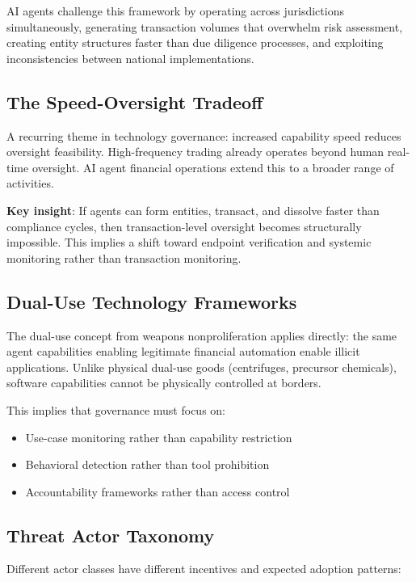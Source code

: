 \documentclass[11pt,letterpaper]{article}
\begin{document}
AI agents challenge this framework by operating across jurisdictions simultaneously, generating transaction volumes that overwhelm risk assessment, creating entity structures faster than due diligence processes, and exploiting inconsistencies between national implementations.

\subsection{The Speed-Oversight Tradeoff}

A recurring theme in technology governance: increased capability speed reduces oversight feasibility. High-frequency trading already operates beyond human real-time oversight. AI agent financial operations extend this to a broader range of activities.

\textbf{Key insight}: If agents can form entities, transact, and dissolve faster than compliance cycles, then transaction-level oversight becomes structurally impossible. This implies a shift toward endpoint verification and systemic monitoring rather than transaction monitoring.

\subsection{Dual-Use Technology Frameworks}

The dual-use concept from weapons nonproliferation applies directly: the same agent capabilities enabling legitimate financial automation enable illicit applications. Unlike physical dual-use goods (centrifuges, precursor chemicals), software capabilities cannot be physically controlled at borders.

This implies that governance must focus on:
\begin{itemize}
  \item Use-case monitoring rather than capability restriction
  \item Behavioral detection rather than tool prohibition
  \item Accountability frameworks rather than access control
\end{itemize}

\subsection{Threat Actor Taxonomy}

Different actor classes have different incentives and expected adoption patterns:
\end{document}
